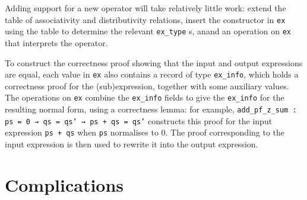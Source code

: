 \documentclass{llncs}
\newcommand{\lean}[1]{\texttt{#1}\xspace} %
\newcommand{\ex}{\lean{ex}}
\newcommand{\ringexp}{\lean{ring\_exp}}
\begin{document}
Adding support for a new operator will take relatively little work:
extend the table of associativity and distributivity relations,
insert the constructor in \ex using the table to determine the relevant \lean{ex\_type}s,
anand an operation on \ex that interprets the operator.

To construct the correctness proof showing that the input and output expressions are equal,
each value in \ex also contains a record of type \lean{ex\_info},
which holds a correctness proof for the (sub)expression, together with some auxiliary values.
The operations on \ex combine the \lean{ex\_info} fields to give the \lean{ex\_info} for the resulting normal form,
using a correctness lemma: for example, \lean{add\_pf\_z\_sum : ps = 0 → qs = qs' → ps + qs = qs'} constructs this proof for the input expression \lean{ps + qs} when \lean{ps} normalises to $0$.
The proof corresponding to the input expression is then used to rewrite it into the output expression.


\section{Complications} %
\end{document}
